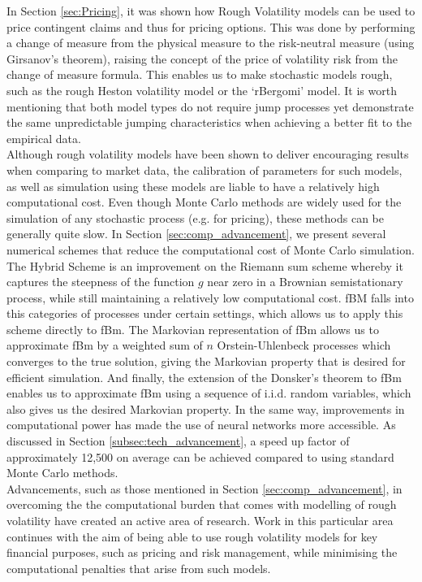 \documentclass[12pt,oneside]{article}
\begin{document}
In Section \ref{sec:Pricing}, it was shown how Rough Volatility models can  be  used  to  price  contingent  claims  and  thus  for  pricing options. This was done by performing a change of measure from the physical measure to the risk-neutral measure (using Girsanov's theorem), raising the concept of the price of volatility risk from the change of measure formula. This enables us to make stochastic models rough, such as the rough Heston volatility model or the `rBergomi' model. It is worth mentioning that both model types do not require jump processes yet demonstrate the same unpredictable jumping characteristics when achieving a better fit to the empirical data.
\\

Although rough volatility models have been shown to deliver encouraging results when comparing to market data, the calibration of parameters for such models, as well as simulation using these models are liable to have a relatively high computational cost. Even though Monte Carlo methods are widely used for the simulation of any stochastic process (e.g. for pricing), these methods can be generally quite slow. In Section \ref{sec:comp_advancement}, we present several numerical schemes that reduce the computational cost of Monte Carlo simulation. The Hybrid Scheme is an improvement on the Riemann sum scheme whereby it captures the steepness of the function $g$ near zero in a Brownian semistationary process, while still maintaining a relatively low computational cost. fBM falls into this categories of processes under certain settings, which allows us to apply this scheme directly to fBm. The Markovian representation of fBm allows us to approximate fBm by a weighted sum of $n$ Orstein-Uhlenbeck processes which converges to the true solution, giving the Markovian property that is desired for efficient simulation. And finally, the extension of the Donsker's theorem to fBm enables us to approximate fBm using a sequence of i.i.d. random variables, which also gives us the desired Markovian property. In the same way, improvements in computational power has made the use of neural networks more accessible. As discussed in Section \ref{subsec:tech_advancement}, a speed up factor of approximately 12,500 on average can be achieved compared to using standard Monte Carlo methods.
\\

Advancements, such as those mentioned in Section \ref{sec:comp_advancement}, in overcoming the the computational burden that comes with modelling of rough volatility have created an active area of research. Work in this particular area continues with the aim of being able to use rough volatility models for key financial purposes, such as pricing and risk management, while minimising the computational penalties that arise from such models. 
\end{document}
